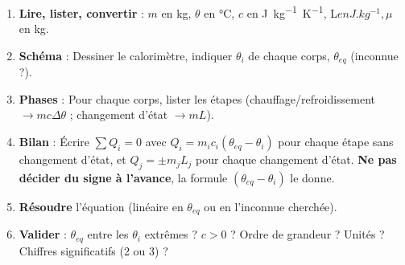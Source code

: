 \documentclass[11pt]{article}
\begin{document}
\begin{methode}
\begin{enumerate}
\item \textbf{Lire, lister, convertir} : $m$ en \si{kg}, $\theta$ en \si{\celsius}, $c$ en \si{J.kg^{-1}.K^{-1}}, L$ en \si{J.kg^{-1}}, \mu$ en \si{kg}.
\item \textbf{Schéma} : Dessiner le calorimètre, indiquer $\theta_i$ de chaque corps, $\theta_{eq}$ (inconnue ?).
\item \textbf{Phases} : Pour chaque corps, lister les étapes (chauffage/refroidissement $\to mc\Delta\theta$ ; changement d'état $\to mL$).
\item \textbf{Bilan} : Écrire $\sum Q_i = 0$ avec $Q_i = m_i c_i (\theta_{eq} - \theta_i)$ pour chaque étape sans changement d'état, et $Q_j = \pm m_j L_j$ pour chaque changement d'état. \textbf{Ne pas décider du signe à l'avance}, la formule $(\theta_{eq}-\theta_i)$ le donne.
\item \textbf{Résoudre} l'équation (linéaire en $\theta_{eq}$ ou en l'inconnue cherchée).
\item \textbf{Valider} : $\theta_{eq}$ entre les $\theta_i$ extrêmes ? $c>0$ ? Ordre de grandeur ? Unités ? Chiffres significatifs (2 ou 3) ?
\end{enumerate}
\end{methode}
\end{document}

